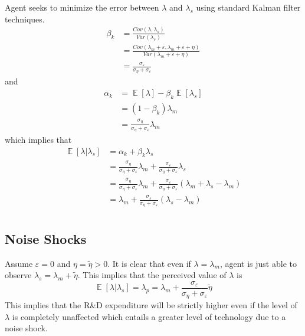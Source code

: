 \documentclass{article}
\DeclareMathOperator{\E}{\mathbb{E}}
\begin{document}
	Agent seeks to minimize the error between $\lambda$ and $\lambda_s$ using standard Kalman filter techniques.
	\begin{equation}
	\begin{split}
	\beta_k &= \frac{Cov(\lambda,\lambda_s)}{Var(\lambda_s)} \\
	&= \frac{Cov(\lambda_m + \varepsilon, \lambda_m + \varepsilon + \eta)}{Var(\lambda_m + \varepsilon + \eta)} \\
	&= \frac{\sigma_{\varepsilon}}{\sigma_{\eta} + \sigma_{\varepsilon}}
	\end{split}
	\end{equation}
	and
	\begin{equation}
	\begin{split}
	\alpha_k &= \E[\lambda] - \beta_k \E[\lambda_s] \\
	&= (1 - \beta_k) \lambda_m \\
	&= \frac{\sigma_{\eta}}{\sigma_{\eta} + \sigma_{\varepsilon}} \lambda_m
	\end{split}
	\end{equation}
	which implies that
	\begin{equation}
	\begin{split}
	\E[\lambda|\lambda_s] &= \alpha_k + \beta_k \lambda_s \\
	&=  \frac{\sigma_{\eta}}{\sigma_{\eta} + \sigma_{\varepsilon}} \lambda_m + \frac{\sigma_{\varepsilon}}{\sigma_{\eta} + \sigma_{\varepsilon}} \lambda_s \\
	&=  \frac{\sigma_{\eta}}{\sigma_{\eta} + \sigma_{\varepsilon}} \lambda_m + \frac{\sigma_{\varepsilon}}{\sigma_{\eta} + \sigma_{\varepsilon}} (\lambda_m + \lambda_s  - \lambda_m) \\
	&= \lambda_m + \frac{\sigma_{\varepsilon}}{\sigma_{\eta} + \sigma_{\varepsilon}} (\lambda_s  - \lambda_m) \\
	\end{split}
	\end{equation}
	
	\subsection*{Noise Shocks}
	
	Assume $\varepsilon = 0$ and $\eta = \tilde{\eta} > 0$.  It is clear that even if $\lambda = \lambda_m$, agent is just able to observe $\lambda_s = \lambda_m + \tilde{\eta}$. This implies that the perceived value of $\lambda$ is
	\begin{equation}
	\E[\lambda | \lambda_s] = \lambda_p = \lambda_m + \frac{\sigma_{\varepsilon}}{\sigma_{\eta} + \sigma_{\varepsilon}} \tilde{\eta}
	\end{equation}
	This implies that the R\&D expenditure will be strictly higher even if the level of $\lambda$ is completely unaffected which entails a greater level of technology due to a noise shock.
	
\end{document}
